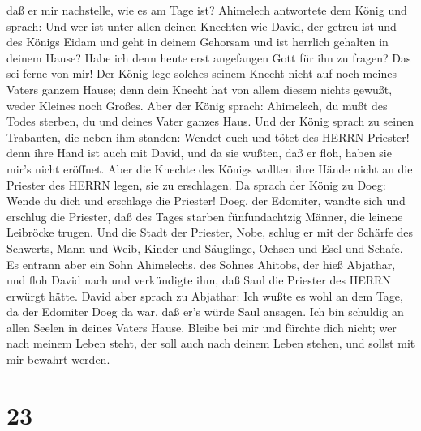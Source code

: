daß er mir nachstelle, wie es am Tage ist?  Ahimelech
antwortete dem König und sprach: Und wer ist unter allen deinen Knechten
wie David, der getreu ist und des Königs Eidam und geht in deinem
Gehorsam und ist herrlich gehalten in deinem Hause?  Habe
ich denn heute erst angefangen Gott für ihn zu fragen? Das sei ferne von
mir! Der König lege solches seinem Knecht nicht auf noch meines Vaters
ganzem Hause; denn dein Knecht hat von allem diesem nichts gewußt, weder
Kleines noch Großes.  Aber der König sprach: Ahimelech, du
mußt des Todes sterben, du und deines Vater ganzes Haus. 
Und der König sprach zu seinen Trabanten, die neben ihm standen: Wendet
euch und tötet des HERRN Priester! denn ihre Hand ist auch mit David,
und da sie wußten, daß er floh, haben sie mir's nicht eröffnet. Aber die
Knechte des Königs wollten ihre Hände nicht an die Priester des HERRN
legen, sie zu erschlagen.  Da sprach der König zu Doeg:
Wende du dich und erschlage die Priester! Doeg, der Edomiter, wandte
sich und erschlug die Priester, daß des Tages starben fünfundachtzig
Männer, die leinene Leibröcke trugen.  Und die Stadt der
Priester, Nobe, schlug er mit der Schärfe des Schwerts, Mann und Weib,
Kinder und Säuglinge, Ochsen und Esel und Schafe.  Es
entrann aber ein Sohn Ahimelechs, des Sohnes Ahitobs, der hieß Abjathar,
und floh David nach  und verkündigte ihm, daß Saul die
Priester des HERRN erwürgt hätte.  David aber sprach zu
Abjathar: Ich wußte es wohl an dem Tage, da der Edomiter Doeg da war,
daß er's würde Saul ansagen. Ich bin schuldig an allen Seelen in deines
Vaters Hause.  Bleibe bei mir und fürchte dich nicht; wer
nach meinem Leben steht, der soll auch nach deinem Leben stehen, und
sollst mit mir bewahrt werden.

\hypertarget{section-22}{%
\section{23}\label{section-22}}

